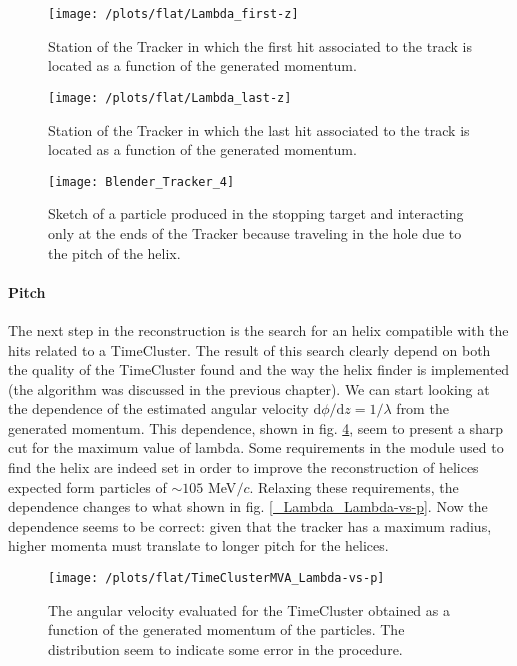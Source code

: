 \documentclass[12pt,a4paper,openright, oneside, titlepage]{book} %
\begin{document}
\begin{figure}[h!]
\centering
\texttt{[image: /plots/flat/Lambda\_first-z]}
\caption{Station of the Tracker in which the first hit associated to the track is located as a function of the generated momentum.}
\label{_Lambda_first-z}
\end{figure}

\begin{figure}[!htb]
\centering
\texttt{[image: /plots/flat/Lambda\_last-z]}
\caption{Station of the Tracker in which the last hit associated to the track is located as a function of the generated momentum.}
\label{_Lambda_last-z}
\end{figure}

\begin{figure}[!htb]
\centering
\texttt{[image: Blender\_Tracker\_4]}
\caption{Sketch of a particle produced in the stopping target and interacting only at the ends of the Tracker because traveling in the hole due to the pitch of the helix.}
\label{_blender}
\end{figure}

\paragraph{Pitch}
The next step in the reconstruction is the search for an helix compatible with the hits related to a TimeCluster.
The result of this search clearly depend on both the quality of the TimeCluster found and the way the helix finder is implemented (the algorithm was discussed in the previous chapter). 
We can start looking at the dependence of the estimated angular velocity $\mathrm{d}\phi/\mathrm{d}z = 1/ \lambda$ from the generated momentum. 
This dependence, shown in fig. \ref{_TimeClusterMVA_Lambda-vs-p}, seem to present a sharp cut for the maximum value of lambda.  
Some requirements in the module used to find the helix are indeed set in order to improve the reconstruction of helices expected form particles of $\sim 105$ MeV$/c$. Relaxing these requirements, the dependence changes to what shown in fig. \ref{_Lambda_Lambda-vs-p}. Now the dependence seems to be correct: given that the tracker has a maximum radius, higher momenta must translate to longer pitch for the helices.\\

\begin{figure}[h!]
\centering
\texttt{[image: /plots/flat/TimeClusterMVA\_Lambda-vs-p]}
\caption{The angular velocity evaluated for the TimeCluster obtained as a function of the generated momentum of the particles. The distribution seem to indicate some error in the procedure.}
\label{_TimeClusterMVA_Lambda-vs-p}
\end{figure}
\end{document}
